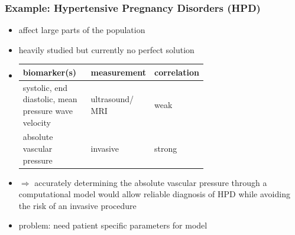 \documentclass{beamer}
\begin{document}
\begin{frame}
	\frametitle{Example: Hypertensive Pregnancy Disorders (HPD)}
	\begin{itemize}
		\item affect large parts of the population
		\item heavily studied but currently no perfect solution 
		\item \begin{tabularx}{\linewidth}{| >{\centering\arraybackslash}m{0.4\linewidth} | >{\centering\arraybackslash}m{0.25\linewidth} | >{\centering\arraybackslash}X |} 
				\hline
				biomarker(s) & measurement & correlation \\ 
				\hline
				\hline
				systolic, end diastolic, mean pressure wave velocity & ultrasound/ MRI & weak \\ 
				\hline
				absolute vascular pressure & invasive & strong \\ 
				\hline
			\end{tabularx}
		\item
			$\Rightarrow$ accurately determining the absolute vascular pressure through a computational model would allow reliable diagnosis of HPD while avoiding the risk of an invasive procedure
		\item problem: need patient specific parameters for model
	\end{itemize}

\end{frame}
\end{document}
